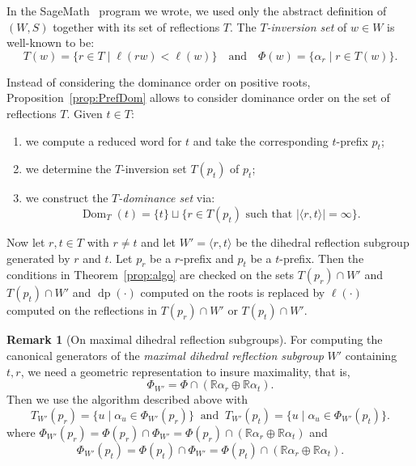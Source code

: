 \documentclass{amsart}
\theoremstyle{definition}
\newtheorem{Remark}[Theorem]{Remark}
\newcommand{\dom}{{\operatorname{Dom}}}
\newcommand{\dep}{\operatorname{dp}}
\begin{document}
In the SageMath~\cite{sage} program we wrote, we used only the abstract definition of $(W,S)$ together with its set of reflections $T$. The {\em $T$-inversion set} of $w\in W$ is well-known to be:
$$
T(w)=\{r \in T\mid \ell(rw)<\ell(w)\}\quad \text{and}\quad \Phi(w)=\{\alpha_r\mid r \in T(w) \}.
$$


Instead of considering the dominance order on positive roots, Proposition~\ref{prop:PrefDom} allows to consider dominance order on the set of reflections $T$. Given $t \in T$: 
\begin{enumerate}
    \item we compute a reduced word for $t$ and take the corresponding $t$-prefix $p_t$;
    \item we determine the $T$-inversion set $T(p_t)$ of $p_t$;  
    \item we construct the {\em $T$-dominance set} via:
$$
\dom_T(t)=\{t\}\sqcup \{ r\in T(p_t) \textrm{ such that }|\langle r,t\rangle| =\infty\}.
$$
\end{enumerate} 

Now let  $r,t\in T$ with $r\not = t$ and let $W'=\langle r,t\rangle$ be the dihedral reflection subgroup generated by $r$ and $t$. Let $p_r$ be a $r$-prefix and $p_t$ be a $t$-prefix. Then the conditions in Theorem~\ref{prop:algo} are checked on the sets $T(p_r)\cap W'$ and $T(p_t)\cap W'$ and $\dep(\cdot)$ computed on the roots is replaced by $\ell(\cdot)$ computed on the reflections in $T(p_r)\cap W'$ or $T(p_t)\cap W'$. 


\begin{Remark}[On maximal dihedral reflection subgroups] For computing the canonical generators of the {\em maximal dihedral reflection subgroup} $W'$ containing $t,r$, we need a geometric representation to insure maximality, that is, $$
\Phi_{W'}=\Phi\cap(\mathbb R\alpha_r\oplus\mathbb R\alpha_t).
$$
Then we use the algorithm described above with 
$$
T_{W'}(p_r)=\{u\mid \alpha_u\in \Phi_{W'}(p_r)\}\ \text{ and }\  T_{W'}(p_t)=\{u\mid \alpha_u\in \Phi_{W'}(p_t)\}.
$$ 
where  $\Phi_{W'}(p_r)=\Phi(p_r)\cap \Phi_{W'}=\Phi(p_r)\cap(\mathbb R\alpha_r\oplus\mathbb R\alpha_t)$ and 
$$
\Phi_{W'}(p_t)=\Phi(p_t)\cap \Phi_{W'}=\Phi(p_t)\cap(\mathbb R\alpha_r\oplus\mathbb R\alpha_t).
$$
\end{Remark}




\end{document}
